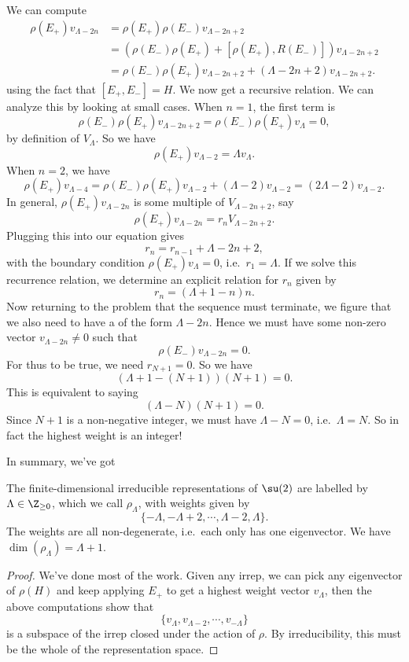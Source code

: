 \documentclass[a4paper]{article}
\begin{document}
We can compute
\begin{align*}
  \rho(E_+) v_{\Lambda - 2n} &= \rho(E_+) \rho(E_-) v_{\Lambda - 2n + 2} \\
  &= (\rho(E_-)\rho(E_+) + [\rho(E_+), R(E_-)]) v_{\Lambda - 2n + 2} \\
  &= \rho(E_-) \rho(E_+) v_{\Lambda - 2n + 2} + (\Lambda - 2n + 2)v_{\Lambda - 2n + 2}.
\end{align*}
using the fact that $[E_+, E_-] = H$. We now get a recursive relation. We can analyze this by looking at small cases. When $n = 1$, the first term is
\[
  \rho(E_-)\rho(E_+) v_{\Lambda - 2n + 2} = \rho(E_-) \rho(E_+) v_\Lambda = 0,
\]
by definition of $V_\Lambda$. So we have
\[
  \rho(E_+) v_{\Lambda - 2} = \Lambda v_\Lambda.
\]
When $n = 2$, we have
\[
  \rho(E_+) v_{\Lambda - 4} = \rho(E_-) \rho(E_+) v_{\Lambda - 2} + (\Lambda - 2) v_{\Lambda - 2} = (2\Lambda - 2) v_{\Lambda - 2}.
\]
In general, $\rho(E_+)v_{\Lambda - 2n}$ is some multiple of $V_{\Lambda - 2n + 2}$, say
\[
  \rho(E_+) v_{\Lambda - 2n} = r_n V_{\Lambda - 2n + 2}.
\]
Plugging this into our equation gives
\[
  r_n = r_{n - 1} + \Lambda - 2n + 2,
\]
with the boundary condition $\rho(E_+)v_\Lambda = 0$, i.e.\ $r_1 = \Lambda$. If we solve this recurrence relation, we determine an explicit relation for $r_n$ given by
\[
  r_n = (\Lambda + 1 - n)n.
\]
Now returning to the problem that the sequence must terminate, we figure that we also need to have a  of the form $\Lambda - 2n$. Hence we must have some non-zero vector $v_{\Lambda - 2n} \not= 0$ such that
\[
  \rho(E_-) v_{\Lambda - 2n} = 0.
\]
For thus to be true, we need $r_{N + 1} = 0$. So we have
\[
  (\Lambda + 1 - (N + 1))(N + 1) = 0.
\]
This is equivalent to saying
\[
  (\Lambda - N)(N + 1) = 0.
\]
Since $N + 1$ is a non-negative integer, we must have $\Lambda - N = 0$, i.e.\ $\Lambda = N$. So in fact the highest weight is an integer!

In summary, we've got
\begin{prop}
  The finite-dimensional irreducible representations of $\su(2)$ are labelled by $\Lambda \in \Z_{\geq 0}$, which we call $\rho_\Lambda$, with weights given by
  \[
    \{-\Lambda, -\Lambda + 2, \cdots, \Lambda - 2, \Lambda\}.
  \]
  The weights are all non-degenerate, i.e.\ each only has one eigenvector. We have $\dim (\rho_\Lambda) = \Lambda + 1$.
\end{prop}

\begin{proof}
  We've done most of the work. Given any irrep, we can pick any eigenvector of $\rho(H)$ and keep applying $E_+$ to get a highest weight vector $v_\Lambda$, then the above computations show that
  \[
    \{v_\Lambda, v_{\Lambda - 2}, \cdots, v_{-\Lambda}\}
  \]
  is a subspace of the irrep closed under the action of $\rho$. By irreducibility, this must be the whole of the representation space.
\end{proof}
\end{document}
